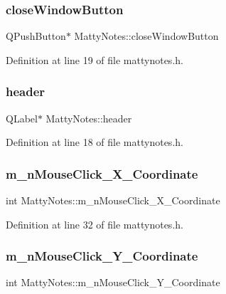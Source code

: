 \subsubsection{\texorpdfstring{close\+Window\+Button}{closeWindowButton}}
{\footnotesize\ttfamily Q\+Push\+Button$\ast$ Matty\+Notes\+::close\+Window\+Button}



Definition at line 19 of file mattynotes.\+h.

\hypertarget{classMattyNotes_a855747a36f73f173f3d8f468c7196572}{}\label{classMattyNotes_a855747a36f73f173f3d8f468c7196572} 
\subsubsection{\texorpdfstring{header}{header}}
{\footnotesize\ttfamily Q\+Label$\ast$ Matty\+Notes\+::header}



Definition at line 18 of file mattynotes.\+h.

\hypertarget{classMattyNotes_a9c2352149386cb95946e3a8526c1ad2c}{}\label{classMattyNotes_a9c2352149386cb95946e3a8526c1ad2c} 
\subsubsection{\texorpdfstring{m\+\_\+n\+Mouse\+Click\+\_\+\+X\+\_\+\+Coordinate}{m\_nMouseClick\_X\_Coordinate}}
{\footnotesize\ttfamily int Matty\+Notes\+::m\+\_\+n\+Mouse\+Click\+\_\+\+X\+\_\+\+Coordinate\hspace{0.3cm}{\ttfamily [private]}}



Definition at line 32 of file mattynotes.\+h.

\hypertarget{classMattyNotes_aa4b9e6a5553ad49e4389340a783a85b9}{}\label{classMattyNotes_aa4b9e6a5553ad49e4389340a783a85b9} 
\subsubsection{\texorpdfstring{m\+\_\+n\+Mouse\+Click\+\_\+\+Y\+\_\+\+Coordinate}{m\_nMouseClick\_Y\_Coordinate}}
{\footnotesize\ttfamily int Matty\+Notes\+::m\+\_\+n\+Mouse\+Click\+\_\+\+Y\+\_\+\+Coordinate\hspace{0.3cm}{\ttfamily [private]}}




